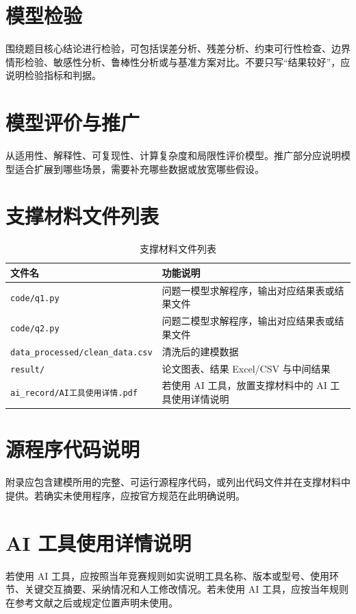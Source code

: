 \documentclass[withoutpreface,bwprint]{cumcmthesis}
\begin{document}
\section{模型检验}
围绕题目核心结论进行检验，可包括误差分析、残差分析、约束可行性检查、边界情形检验、敏感性分析、鲁棒性分析或与基准方案对比。不要只写“结果较好”，应说明检验指标和判据。

\section{模型评价与推广}
从适用性、解释性、可复现性、计算复杂度和局限性评价模型。推广部分应说明模型适合扩展到哪些场景，需要补充哪些数据或放宽哪些假设。




\appendix
\section{支撑材料文件列表}
\begin{table}[H]
\centering
\caption{支撑材料文件列表}
\begin{tabularx}{\textwidth}{lX}
\toprule
文件名 & 功能说明 \\
\midrule
\texttt{code/q1.py} & 问题一模型求解程序，输出对应结果表或结果文件 \\
\texttt{code/q2.py} & 问题二模型求解程序，输出对应结果表或结果文件 \\
\texttt{data\_processed/clean\_data.csv} & 清洗后的建模数据 \\
\texttt{result/} & 论文图表、结果 Excel/CSV 与中间结果 \\
\texttt{ai\_record/AI工具使用详情.pdf} & 若使用 AI 工具，放置支撑材料中的 AI 工具使用详情说明 \\
\bottomrule
\end{tabularx}
\end{table}

\section{源程序代码说明}
附录应包含建模所用的完整、可运行源程序代码，或列出代码文件并在支撑材料中提供。若确实未使用程序，应按官方规范在此明确说明。

\section{AI 工具使用详情说明}
若使用 AI 工具，应按照当年竞赛规则如实说明工具名称、版本或型号、使用环节、关键交互摘要、采纳情况和人工修改情况。若未使用 AI 工具，应按当年规则在参考文献之后或规定位置声明未使用。
\end{document}
